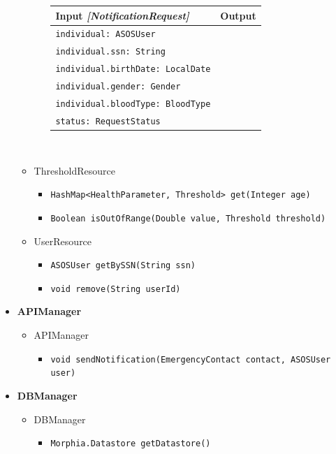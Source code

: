 \documentclass[a4paper, hidelinks, 12pt]{report}
\begin{document}
\begin{itemize}
\begin{itemize}
\begin{itemize}
				\begin{tabular}{l | l}
				\textbf{Input} \textit{[NotificationRequest]} & \textbf{Output} \\
				\hline
					\verb|individual: ASOSUser| & \\
					\verb|individual.ssn: String| & \\
					\verb|individual.birthDate: LocalDate| & \\
					\verb|individual.gender: Gender| & \\
					\verb|individual.bloodType: BloodType| & \\
					\verb|status: RequestStatus| & \\
				\end{tabular}\\
					\end{itemize}
					\item{ThresholdResource}
					\begin{itemize}
						\item{\verb|HashMap<HealthParameter, Threshold> get(Integer age)|}
						\item{\verb|Boolean isOutOfRange(Double value, Threshold threshold)|}
					\end{itemize}
					\item{UserResource}
					\begin{itemize}
						\item{\verb|ASOSUser getBySSN(String ssn)|}
						\item{\verb|void remove(String userId)|}
					\end{itemize}
			\end{itemize}
		\item{\textbf{APIManager}}
			\begin{itemize}
				\item{APIManager}
					\begin{itemize}
						\item{\verb|void sendNotification(EmergencyContact contact, ASOSUser user)|}
					\end{itemize}
			\end{itemize}
		\item{\textbf{DBManager}}
			\begin{itemize}
				\item{DBManager}
					\begin{itemize}
						\item{\verb|Morphia.Datastore getDatastore()|}
					\end{itemize}
			\end{itemize}
	\end{itemize}	
	
\end{document}
